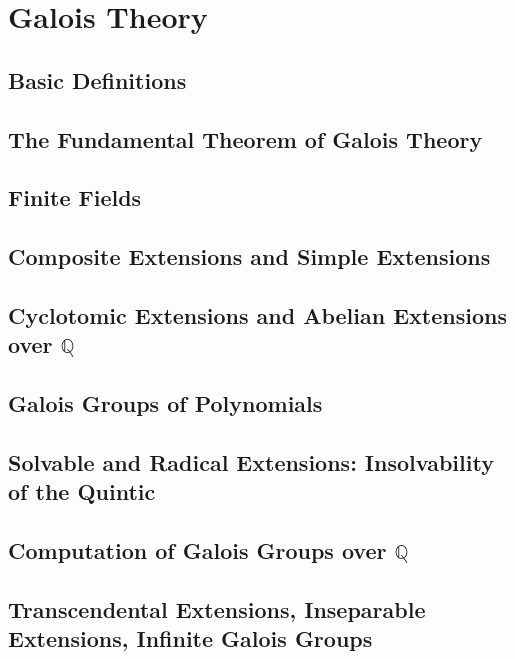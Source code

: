 \chapter{Galois Theory}

\section{Basic Definitions}

\section{The Fundamental Theorem of Galois Theory}

\section{Finite Fields}

\section{Composite Extensions and Simple Extensions}

\section{Cyclotomic Extensions and Abelian Extensions over $\mathbb{Q}$}

\section{Galois Groups of Polynomials}

\section{Solvable and Radical Extensions: Insolvability of the Quintic}

\section{Computation of Galois Groups over $\mathbb{Q}$}

\section{Transcendental Extensions, Inseparable Extensions, Infinite Galois Groups}